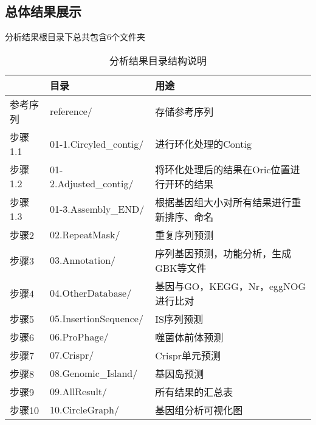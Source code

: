 \subsection{总体结果展示}
分析结果根目录下总共包含6个文件夹
\begin{table}[htb]
    \caption{分析结果目录结构说明}
        \begin{center}
            \begin{threeparttable}
                \begin{tabularx}{\textwidth}{llX}

                    \toprule
                    &\bfseries{目录}&\bfseries{用途}\\
                    \midrule
                    参考序列&reference/&存储参考序列\\
                    步骤1.1&01-1.Circyled\_contig/&进行环化处理的Contig\\
                    步骤1.2&01-2.Adjusted\_contig/&将环化处理后的结果在Oric位置进行开环的结果\\
                    步骤1.3&01-3.Assembly\_END/&根据基因组大小对所有结果进行重新排序、命名\\
                    步骤2&02.RepeatMask/&重复序列预测\\
                    步骤3&03.Annotation/&序列基因预测，功能分析，生成GBK等文件\\
                    步骤4&04.OtherDatabase/&基因与GO，KEGG，Nr，eggNOG进行比对\\
                    步骤5&05.InsertionSequence/&IS序列预测\\
                    步骤6&06.ProPhage/&噬菌体前体预测\\
                    步骤7&07.Crispr/&Crispr单元预测\\
                    步骤8&08.Genomic\_Island/&基因岛预测\\
                    步骤9&09.AllResult/&所有结果的汇总表\\
                    步骤10&10.CircleGraph/&基因组分析可视化图\\

                    \bottomrule

                \end{tabularx}

            \end{threeparttable}
        \end{center}
\end{table}
　

